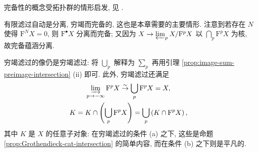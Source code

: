 完备性的概念受拓扑群的情形启发, 见 \cite[\S 4.10]{Li1}.

有限滤过自动是分离, 穷竭而完备的, 这也是本章需要的主要情形. 注意到若存在 $N$ 使得 $\mathrm{F}^N X = 0$, 则 $\mathrm{F}^\bullet X$ 分离而完备; 又因为 $X \to \varprojlim_p X/\mathrm{F}^p X$ 以 $\bigcap_p \mathrm{F}^p X$ 为核, 故完备蕴涵分离.

穷竭滤过的像仍是穷竭滤过: 将 $\bigcup_p$ 解释为 $\sum_p$ 再用引理 \ref{prop:image-sum-preimage-intersection} (ii) 即可. 此外, 穷竭滤过还满足
\begin{equation}\label{eqn:exhaustion-intersection}\begin{gathered}
	\varinjlim_{p \to -\infty} \mathrm{F}^p X \stackrel{\sim}{\rightarrow} \bigcup_p \mathrm{F}^p X = X, \\
	K = K \cap \left( \bigcup_p \mathrm{F}^p X \right) = \bigcup_p \left( K \cap \mathrm{F}^p X \right),
\end{gathered}\end{equation}
其中 $K$ 是 $X$ 的任意子对象: 在穷竭滤过的条件 (a) 之下, 这些是命题 \ref{prop:Grothendieck-cat-intersection} 的简单内容, 而在条件 (b) 之下则是平凡的.

